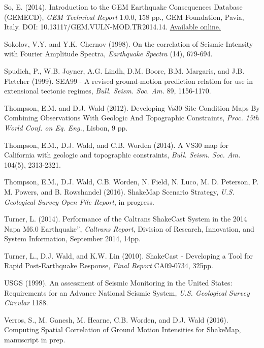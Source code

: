 \documentclass[letterpaper,10pt,english]{sphinxmanual}
\begin{document}
\label{references:so2014}
So, E. (2014). Introduction to the GEM Earthquake Consequences Database (GEMECD), \emph{GEM
Technical Report} 1.0.0, 158 pp., GEM Foundation, Pavia, Italy.
DOI: 10.13117/GEM.VULN-MOD.TR2014.14. \href{http://www.globalquakemodel.org/resources/publications/technical-reports/introduction-gem-earthquake-consequences-database-/}{Available online.}

Sokolov, V.Y. and Y.K. Chernov (1998). On the correlation of Seismic Intensity with Fourier Amplitude
Spectra, \emph{Earthquake Spectra} (14), 679-694.

Spudich, P., W.B. Joyner, A.G. Lindh, D.M. Boore, B.M. Margaris, and J.B. Fletcher (1999). SEA99 - A
revised ground-motion prediction relation for use in extensional tectonic regimes, \emph{Bull. Seism. Soc. Am.}
89, 1156-1170.

\label{references:thompson2012}
Thompson, E.M. and D.J. Wald (2012). Developing Vs30 Site-Condition Maps By Combining Observations
With Geologic And Topographic Constraints, \emph{Proc. 15th World Conf. on Eq. Eng.}, Lisbon, 9 pp.

\label{references:thompson2014}
Thompson, E.M., D.J. Wald, and C.B. Worden (2014).  A VS30 map for California with geologic and
topographic constraints, \emph{Bull. Seism. Soc. Am.} 104(5), 2313-2321.

\label{references:thompson2016}
Thompson, E.M., D.J. Wald, C.B. Worden, N. Field, N. Luco, M. D. Peterson, P. M. Powers,
and B. Rowshandel (2016).  ShakeMap Scenario Strategy, \emph{U.S. Geological Survey Open File Report},
in progress.

\label{references:turner2014}
Turner, L. (2014). Performance of the Caltrans ShakeCast System in the
2014 Napa M6.0 Earthquake”, \emph{Caltrans Report}, Division of Research,
Innovation, and System Information, September 2014, 14pp.

\label{references:turner2010}
Turner, L., D.J. Wald, and K.W. Lin (2010). ShakeCast - Developing a Tool for Rapid
Post-Earthquake Response, \emph{Final Report} CA09-0734, 325pp.

\label{references:usgs1999}
USGS (1999). An assessment of Seismic Monitoring in the United States: Requirements for an Advance
National Seismic System, \emph{U.S. Geological Survey Circular} 1188.

\label{references:verros2016}
Verros, S., M. Ganesh, M. Hearne, C.B. Worden, and D.J. Wald (2016).
Computing Spatial Correlation of Ground Motion Intensities for ShakeMap, manuscript in prep.
\end{document}

